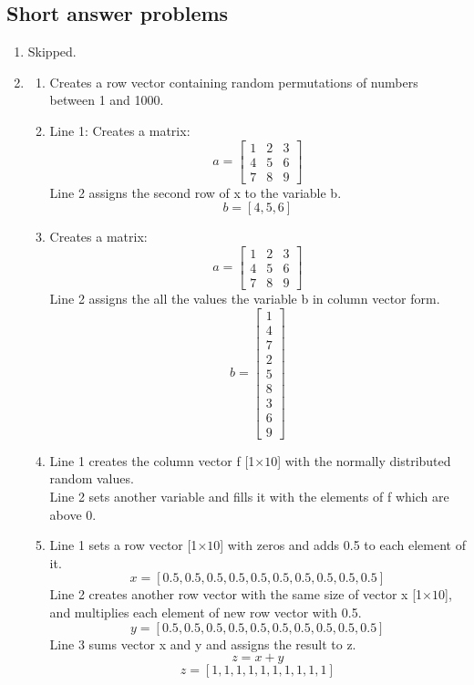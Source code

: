 \documentclass[man]{apa6}
\begin{document}
\subsection{Short answer problems}
	\begin{enumerate}
		\item Skipped.
		
		\item 
			\begin{enumerate}
				\item Creates a row vector containing random permutations of numbers between 1 and 1000.
				
				\item Line 1: Creates a matrix: \\
					\[ a= \left[ \begin{array}{ccc}
					1 & 2 & 3 \\
					4 & 5 & 6 \\
					7 & 8 & 9 \end{array} \right]\] 
					Line 2 assigns the second row of x to the variable b.
					$$ b = [4,5,6]$$

				\item Creates a matrix: \\
					\[ a= \left[ \begin{array}{ccc}
					1 & 2 & 3 \\
					4 & 5 & 6 \\
					7 & 8 & 9 \end{array} \right]\] 
					Line 2 assigns the all the values the variable b in column vector form.
					\[ b= \left[ \begin{array}{c}
					1 \\ 4 \\ 7 \\
					2 \\ 5 \\ 8 \\
					3 \\ 6 \\ 9 \end{array} \right]\] 

				\item Line 1 creates the column vector f [1$\times10$] with the normally distributed random values. \\
					Line 2 sets another variable and fills it with the elements of f which are above 0.

				\item Line 1 sets a row vector  [1$\times10$] with zeros and adds 0.5 to each element of it.
					$$x= [0.5,0.5,0.5,0.5,0.5,0.5,0.5,0.5,0.5,0.5]$$
					Line 2 creates another row vector with the same size of vector x [1$\times10$], and multiplies each element of new row vector with 0.5. \\
					$$y= [0.5,0.5,0.5,0.5,0.5,0.5,0.5,0.5,0.5,0.5]$$
					Line 3 sums vector x and y and assigns the result to z.
					$$z = x + y$$
					$$z= [1,1,1,1,1,1,1,1,1,1]$$
					

\end{enumerate}
\end{enumerate}
\end{document}
